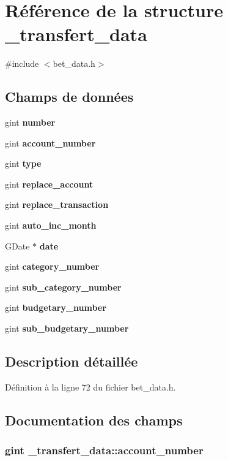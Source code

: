 \section{Référence de la structure \_\-transfert\_\-data}
\label{struct__transfert__data}


{\ttfamily \#include $<$bet\_\-data.h$>$}

\subsection*{Champs de données}
\begin{DoxyCompactItemize}
\item 
gint {\bf number}
\item 
gint {\bf account\_\-number}
\item 
gint {\bf type}
\item 
gint {\bf replace\_\-account}
\item 
gint {\bf replace\_\-transaction}
\item 
gint {\bf auto\_\-inc\_\-month}
\item 
GDate $\ast$ {\bf date}
\item 
gint {\bf category\_\-number}
\item 
gint {\bf sub\_\-category\_\-number}
\item 
gint {\bf budgetary\_\-number}
\item 
gint {\bf sub\_\-budgetary\_\-number}
\end{DoxyCompactItemize}


\subsection{Description détaillée}


Définition à la ligne 72 du fichier bet\_\-data.h.



\subsection{Documentation des champs}
\subsubsection[{account\_\-number}]{\setlength{\rightskip}{0pt plus 5cm}gint {\bf \_\-transfert\_\-data::account\_\-number}}\label{struct__transfert__data_a3ba1dcd56a9cfaa0bd852a153e8b4bb3}


